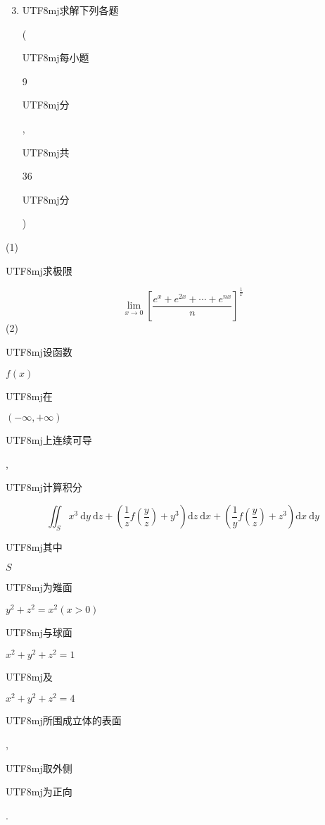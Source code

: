 \documentclass[10pt]{article}
\begin{document}
\begin{enumerate}
  \setcounter{enumi}{2}
  \item \begin{CJK}{UTF8}{mj}求解下列各题\end{CJK} (\begin{CJK}{UTF8}{mj}每小题\end{CJK} 9 \begin{CJK}{UTF8}{mj}分\end{CJK}, \begin{CJK}{UTF8}{mj}共\end{CJK} 36 \begin{CJK}{UTF8}{mj}分\end{CJK})
\end{enumerate}
(1) \begin{CJK}{UTF8}{mj}求极限\end{CJK}
$$
\lim _{x \rightarrow 0}\left[\frac{e^{x}+e^{2 x}+\cdots+e^{n x}}{n}\right]^{\frac{1}{x}}
$$
(2) \begin{CJK}{UTF8}{mj}设函数\end{CJK} $f(x)$ \begin{CJK}{UTF8}{mj}在\end{CJK} $(-\infty,+\infty)$ \begin{CJK}{UTF8}{mj}上连续可导\end{CJK}, \begin{CJK}{UTF8}{mj}计算积分\end{CJK}
$$
\iint_{S} x^{3} \mathrm{~d} y \mathrm{~d} z+\left(\frac{1}{z} f\left(\frac{y}{z}\right)+y^{3}\right) \mathrm{d} z \mathrm{~d} x+\left(\frac{1}{y} f\left(\frac{y}{z}\right)+z^{3}\right) \mathrm{d} x \mathrm{~d} y
$$
\begin{CJK}{UTF8}{mj}其中\end{CJK} $S$ \begin{CJK}{UTF8}{mj}为雉面\end{CJK} $y^{2}+z^{2}=x^{2}(x>0)$ \begin{CJK}{UTF8}{mj}与球面\end{CJK} $x^{2}+y^{2}+z^{2}=1$ \begin{CJK}{UTF8}{mj}及\end{CJK} $x^{2}+y^{2}+z^{2}=4$ \begin{CJK}{UTF8}{mj}所围成立体的表面\end{CJK}, \begin{CJK}{UTF8}{mj}取外侧\end{CJK} \begin{CJK}{UTF8}{mj}为正向\end{CJK}.
\end{document}
